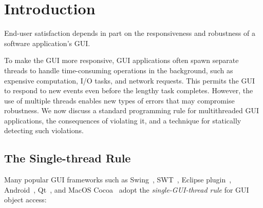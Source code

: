 \section{Introduction}
\label{sec:introduction}

End-user satisfaction depends in part on the responsiveness and
robustness of a software application's GUI.

To make the GUI more responsive, 
GUI applications often spawn separate threads to handle time-consuming
operations in the background, such as expensive computation, I/O tasks,
and network requests. This permits the GUI to respond to new events
even before the lengthy task completes. However, the use of multiple threads
enables new types of errors that may compromise robustness.
We now discuss a standard programming rule for multithreaded GUI applications, the consequences
of violating it, and a technique for statically detecting such violations.




\subsection{The Single-thread Rule}

Many popular GUI frameworks such as Swing~\cite{swing}, SWT~\cite{swt}, Eclipse plugin~\cite{eclipse},
Android~\cite{android}, Qt~\cite{qt}, and MacOS Cocoa~\cite{macos}
adopt the \textit{single-GUI-thread rule} for GUI object access:

\makeatletter
\newenvironment{myquotation}
               {\list{}{\listparindent=0pt%
                        \itemindent    \listparindent
                        \leftmargin=10pt%
                        \rightmargin=0pt%
                        \topsep=0pt%
                        \parsep        \z@ \@plus\p@}%
                \item\relax}
               {\endlist}
\makeatother

